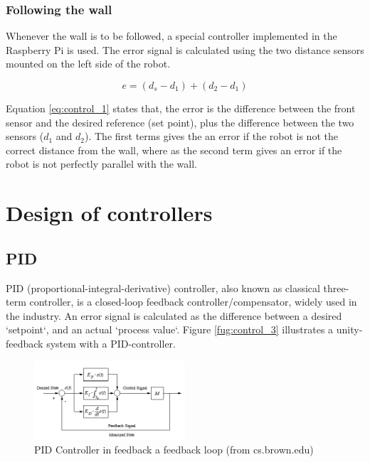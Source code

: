\subsubsection{Following the wall}
Whenever the wall is to be followed, a special controller implemented in the Raspberry Pi is used. The error signal is calculated using the two distance sensors mounted on the left side of the robot.

\begin{equation}\label{eq:control_1}
	e = (d_s - d_1) + (d_2 - d_1)
\end{equation}

Equation \ref{eq:control_1} states that, the error is the difference between the front sensor and the desired reference (set point), plus the difference between the two sensors ($d_1$ and $d_2$). The first terms gives the an error if the robot is not the correct distance from the wall, where as the second term gives an error if the robot is not perfectly parallel with the wall.


%
%
%
%
\section{Design of controllers}

\subsection{PID}
PID (proportional-integral-derivative) controller, also known as classical three-term controller, is a closed-loop feedback controller/compensator, widely used in the industry. An error signal is calculated as the difference between a desired `setpoint`, and an actual `process value`. Figure \ref{fug:control_3} illustrates a unity-feedback system with a PID-controller. 

\begin{figure}[!ht]
	\centering
	\includegraphics[width=0.5\textwidth]{resources/pid}
	\caption{PID Controller in feedback a feedback loop (from cs.brown.edu)}
	\label{fig:control_3}
\end{figure}

